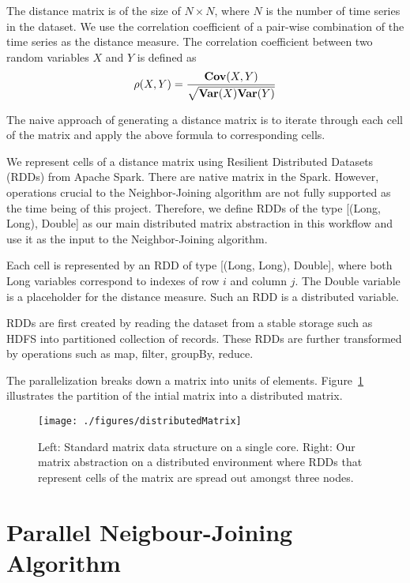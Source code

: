 The distance matrix is of the size of  $N \times N$, where $N$ is the number of time series in the dataset. We use the correlation coefficient of a pair-wise combination of the time series as the distance measure. The correlation coefficient between two random variables $X$ and $Y$ is defined as $$\rho(X,Y) = \frac{{\bf
		Cov}(X,Y)}{\sqrt{{\bf Var}(X){\bf Var}(Y)}}$$

The naive approach of generating a distance matrix is to iterate through each cell of the matrix and apply the above formula to corresponding cells.  

We represent cells of a distance matrix using Resilient Distributed Datasets (RDDs) from Apache Spark\cite{zaharia2016apache}. There are native matrix in the Spark. However, operations crucial to the Neighbor-Joining algorithm are not fully supported as the time being of this project. Therefore, we define RDDs of the type \textsf{[(Long, Long), Double]} as our main distributed matrix abstraction in this workflow and use it as the input to the Neighbor-Joining algorithm.

Each cell is represented by an RDD of type \textsf{[(Long, Long), Double]}, where both \textsf{Long} variables correspond to indexes of row $i$ and column $j$. The \textsf{Double} variable is a placeholder for the distance measure. Such an RDD is a distributed variable. 

RDDs are first created by reading the dataset from a stable storage such as HDFS into partitioned collection of records. These RDDs are further transformed by operations such as \textsf{map}, \textsf{filter}, \textsf{groupBy}, \textsf{reduce}. 

The parallelization breaks down a matrix into units of elements. Figure~\ref{fig:dmdistribution} illustrates the partition of the intial matrix into a distributed matrix. 

\begin{figure}
\begin{center}
	\texttt{[image: ./figures/distributedMatrix]}	
	{\caption{Left: Standard matrix data structure on a single core. Right: Our matrix abstraction on a distributed environment where RDDs that represent cells of the matrix are spread out amongst three nodes.}	
		\label{fig:dmdistribution}}
\end{center}
\end{figure}

\section{Parallel Neigbour-Joining Algorithm}

